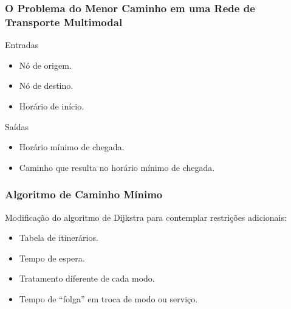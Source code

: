 \frame
{
\frametitle{O Problema do Menor Caminho em uma Rede de Transporte Multimodal}
\begin{exampleblock}{Entradas}
	\begin{itemize}
	\item Nó de origem.
	\item Nó de destino.
	\item Horário de início.
	\end{itemize}
\end{exampleblock}

\begin{alertblock}{Saídas}
	\begin{itemize}
	\item Horário mínimo de chegada.
	\item Caminho que resulta no horário mínimo de chegada.
	\end{itemize}
\end{alertblock}
}

\frame
{
\frametitle{Algoritmo de Caminho Mínimo}
Modificação do algoritmo de Dijkstra para contemplar restrições adicionais:
	\begin{itemize}
	\item Tabela de itinerários.
	\item Tempo de espera.
	\item Tratamento diferente de cada modo.
	\item Tempo de ``folga'' em troca de modo ou serviço.
	\end{itemize}
}
